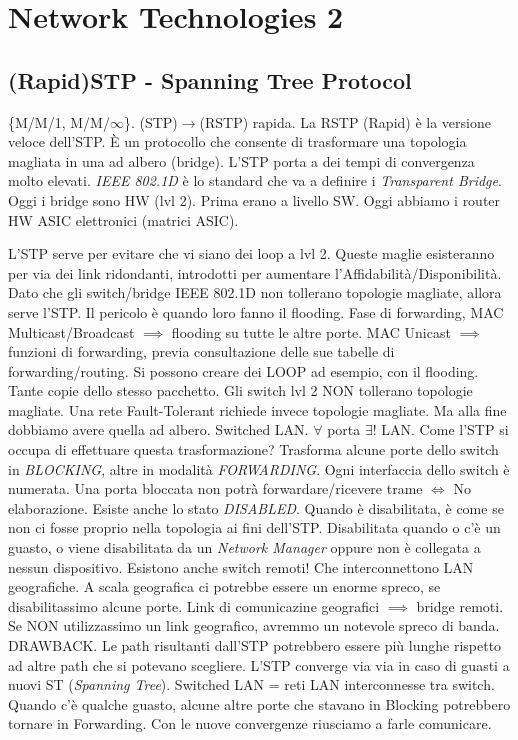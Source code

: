 
\chapter{Network Technologies 2}
\label{cap:nt2}

\section{(Rapid)STP - Spanning Tree Protocol}

\{M/M/1, M/M/$\infty$\}. (STP)$\rightarrow$(RSTP) rapida. La RSTP (Rapid) è la versione veloce dell'STP. \`E un protocollo che consente di trasformare una topologia magliata in una ad albero (bridge). L'STP porta a dei tempi di convergenza molto elevati. \textit{IEEE 802.1D} è lo standard che va a definire i \textit{Transparent Bridge}. Oggi i bridge sono HW (lvl 2). Prima erano a livello SW. Oggi abbiamo i router HW ASIC elettronici (matrici ASIC).

L'STP serve per evitare che vi siano dei loop a lvl 2. Queste maglie esisteranno per via dei link ridondanti, introdotti per aumentare l'Affidabilità/Disponibilità. Dato che gli switch/bridge IEEE 802.1D non tollerano topologie magliate, allora serve l'STP. Il pericolo è quando loro fanno il flooding. Fase di forwarding, MAC Multicast/Broadcast $\implies$ flooding su tutte le altre porte. MAC Unicast $\implies$ funzioni di forwarding, previa consultazione delle sue tabelle di forwarding/routing. Si possono creare dei LOOP ad esempio, con il flooding. Tante copie dello stesso pacchetto. Gli switch lvl 2 NON tollerano topologie magliate. Una rete Fault-Tolerant richiede invece topologie magliate. Ma alla fine dobbiamo avere quella ad albero. Switched LAN. $\forall$ porta $\exists!$ LAN. Come l'STP si occupa di effettuare questa trasformazione? Trasforma alcune porte dello switch in \textit{BLOCKING}, altre in modalità \textit{FORWARDING}. Ogni interfaccia dello switch è numerata. Una porta bloccata non potrà forwardare/ricevere trame $\iff$ No elaborazione. Esiste anche lo stato \textit{DISABLED}. Quando è disabilitata, è come se non ci fosse proprio nella topologia ai fini dell'STP. Disabilitata quando o c'è un guasto, o viene disabilitata da un \textit{Network Manager} oppure non è collegata a nessun dispositivo. Esistono anche switch remoti! Che interconnettono LAN geografiche. A scala geografica ci potrebbe essere un enorme spreco, se disabilitassimo alcune porte. Link di comunicazine geografici $\implies$ bridge remoti. Se NON utilizzassimo un link geografico, avremmo un notevole spreco di banda. DRAWBACK. Le path risultanti dall'STP potrebbero essere più lunghe rispetto ad altre path che si potevano scegliere. L'STP converge via via in caso di guasti a nuovi ST (\textit{Spanning Tree}). Switched LAN = reti LAN interconnesse tra switch. Quando c'è qualche guasto, alcune altre porte che stavano in Blocking potrebbero tornare in Forwarding. Con le nuove convergenze riusciamo a farle comunicare.

